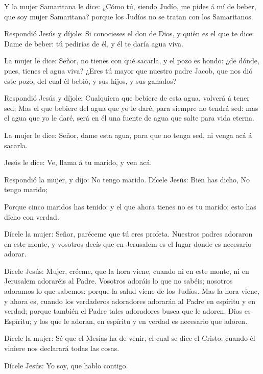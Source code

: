  Y la mujer Samaritana le dice: ¿Cómo tú, siendo Judío, me
pides á mí de beber, que soy mujer Samaritana? porque los Judíos no se
tratan con los Samaritanos.

 Respondió Jesús y díjole: Si conocieses el don de Dios,
y quién es el que te dice: Dame de beber: tú pedirías de él, y él te
daría agua viva.

 La mujer le dice: Señor, no tienes con qué sacarla, y el
pozo es hondo: ¿de dónde, pues, tienes el agua viva? 
¿Eres tú mayor que nuestro padre Jacob, que nos dió este pozo, del cual
él bebió, y sus hijos, y sus ganados?

 Respondió Jesús y díjole: Cualquiera que bebiere de esta
agua, volverá á tener sed;  Mas el que bebiere del agua
que yo le daré, para siempre no tendrá sed: mas el agua que yo le daré,
será en él una fuente de agua que salte para vida eterna.

 La mujer le dice: Señor, dame esta agua, para que no
tenga sed, ni venga acá á sacarla.

 Jesús le dice: Ve, llama á tu marido, y ven acá.

 Respondió la mujer, y dijo: No tengo marido. Dícele
Jesús: Bien has dicho, No tengo marido;

 Porque cinco maridos has tenido: y el que ahora tienes
no es tu marido; esto has dicho con verdad.

 Dícele la mujer: Señor, paréceme que tú eres profeta.
 Nuestros padres adoraron en este monte, y vosotros decís
que en Jerusalem es el lugar donde es necesario adorar.

 Dícele Jesús: Mujer, créeme, que la hora viene, cuando
ni en este monte, ni en Jerusalem adoraréis al Padre. 
Vosotros adoráis lo que no sabéis; nosotros adoramos lo que sabemos:
porque la salud viene de los Judíos.  Mas la hora viene,
y ahora es, cuando los verdaderos adoradores adorarán al Padre en
espíritu y en verdad; porque también el Padre tales adoradores busca que
le adoren.  Dios es Espíritu; y los que le adoran, en
espíritu y en verdad es necesario que adoren.

 Dícele la mujer: Sé que el Mesías ha de venir, el cual
se dice el Cristo: cuando él viniere nos declarará todas las cosas.

 Dícele Jesús: Yo soy, que hablo contigo.

